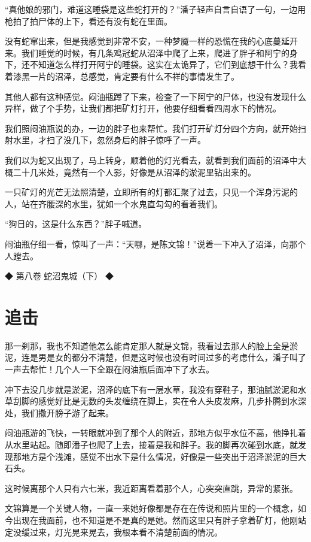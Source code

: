 “真他娘的邪门，难道这睡袋是这些蛇打开的？”潘子轻声自言自语了一句，一边用枪拍了拍尸体的上下，看还有没有蛇在里面。

没有蛇窜出来，但是我感觉到非常不安，一种梦魇一样的恐慌在我的心底蔓延开来。我们睡觉的时候，有几条鸡冠蛇从沼泽中爬了上来，爬进了胖子和阿宁的身下，还不知道怎么样打开阿宁的睡袋。这实在太诡异了，它们到底想干什么？我看着漆黑一片的沼泽，总感觉，肯定要有什么不祥的事情发生了。

其他人都有这种感觉。闷油瓶蹲了下来，检查了一下阿宁的尸体，也没有发现什么异样，做了个手势，让我们都把矿灯打开，他要仔细看看四周水下的情况。

我们照闷油瓶说的办，一边的胖子也来帮忙。我们打开矿灯分四个方向，就开始扫射水里，才扫了没几下，忽然身后的胖子惊呼了一声。

我们以为蛇又出现了，马上转身，顺着他的灯光看去，就看到我们面前的沼泽中大概二十几米处，竟然有一个人影，好像是从沼泽的淤泥里钻出来的。

一只矿灯的光芒无法照清楚，立即所有的灯都汇聚了过去，只见一个浑身污泥的人，站在齐腰深的水里，犹如一个水鬼直勾勾的看着我们。

“狗日的，这是什么东西？”胖子喊道。

闷油瓶仔细一看，惊叫了一声：“天哪，是陈文锦！”说着一下冲入了沼泽，向那个人蹚去。

◆ 第八卷 蛇沼鬼城（下） ◆

\chapter{追击}

那一刹那，我也不知道他怎么能肯定那人就是文锦，我看过去那人的脸上全是淤泥，连是男是女的都分不清楚，但是这时候也没有时间过多的考虑什么，潘子叫了一声去帮忙！几个人一下全跟在闷油瓶后面冲下了水去。

冲下去没几步就是淤泥，沼泽的底下有一层水草，我没有穿鞋子，那油腻淤泥和水草刮脚的感觉好比是无数的头发缠绕在脚上，实在令人头皮发麻，几步扑腾到水深处，我们撒开膀子游了起来。

闷油瓶游的飞快，一转眼就冲到了那个人的附近，那地方似乎水位不高，他挣扎着从水里站起。随即潘子也爬了上去，接着是我和胖子。我的脚再次碰到水底，就发现那地方是个浅滩，感觉不出水下是什么情况，好像是一些突出于沼泽淤泥的巨大石头。

这时候离那个人只有六七米，我近距离看着那个人，心突突直跳，异常的紧张。

文锦算是一个关键人物，一直一来她好像都是存在在传说和照片里的一个概念，如今出现在我面前，也不知道是不是真的是她。然而这里只有胖子拿着矿灯，他刚站定没缓过来，灯光晃来晃去，我根本看不清楚前面的情况。

